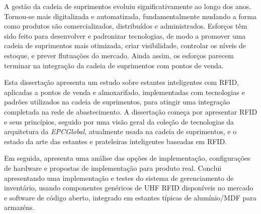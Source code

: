 A gestão da cadeia de suprimentos evoluiu significativamente ao longo dos anos. Tornou-se mais digitalizada e automatizada, fundamentalmente mudando a forma como produtos são comercializados, distribuídos e administrados. Esforços têm sido feito para desenvolver e padronizar tecnologias, de modo a promover uma cadeia de suprimentos mais otimizada, criar visibilidade,  controlar os níveis de estoque, e prever flutuações do mercado.
Ainda assim, os esforços parecem terminar na integração da cadeia de suprimentos com pontos de venda.

Esta dissertação apresenta um estudo sobre estantes inteligentes com RFID, aplicadas a pontos de venda e almoxarifado, implementadas com tecnologias e padrões utilizados na cadeia de suprimentos, para atingir uma integração completada na rede de abastecimento.
A dissertação começa por apresentar RFID e seus princípios,
seguido por uma visão geral da coleção de tecnologias da arquitetura da \emph{EPCGlobal}, atualmente usada na cadeia de suprimentos, e o estado da arte das estantes e prateleiras inteligentes baseadas em RFID.

Em seguida, apresenta uma análise das opções de implementação, configurações de hardware e propostas de implementação para produto real.
Conclui apresentando uma implementação e testes do sistema de gerenciamento de inventário, usando componentes genéricos de UHF RFID disponíveis no mercado e software de código aberto, integrado em estantes típicas de alumínio/MDF para armazéns.